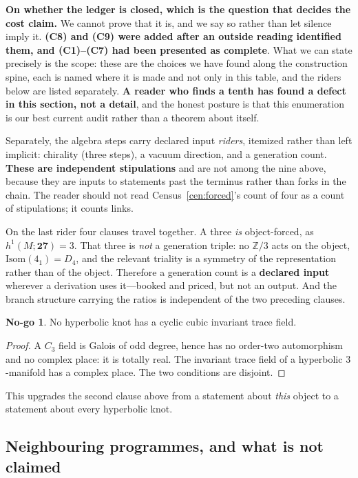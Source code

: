 \documentclass[11pt,reqno]{amsart}
\theoremstyle{plain}
\theoremstyle{definition}
\newtheorem{nogo}[theorem]{No-go}
\theoremstyle{remark}
\newcommand{\Z}{\mathbb{Z}}
\begin{document}
\textbf{On whether the ledger is closed, which is the question that decides the cost
claim.} We cannot prove that it is, and we say so rather than let silence imply it.
\textbf{(C8) and (C9) were added after an outside reading identified them, and
(C1)--(C7) had been presented as complete}. What we can state precisely is the scope:
these are the choices we have found along the construction spine, each is named where it
is made and not only in this table, and the riders below are listed separately.
\textbf{A reader who finds a tenth has found a defect in this section, not a detail},
and the honest posture is that this enumeration is our best current audit rather than a
theorem about itself.

Separately, the algebra steps carry declared input \emph{riders}, itemized rather than
left implicit: chirality (three steps), a vacuum direction, and a generation count.
\textbf{These are independent stipulations} and are not among the nine above, because
they are inputs to statements past the terminus rather than forks in the chain. The
reader should not read Census~\ref{cen:forced}'s count of four as a count of
stipulations; it counts links.

On the last rider four clauses travel together. A three \emph{is} object-forced, as
$h^1(M;\mathbf{27})=3$. That three is \emph{not} a generation triple: no $\Z/3$ acts on
the object, $\mathrm{Isom}(4_1)=D_4$, and the relevant triality is a symmetry of the
representation rather than of the object. Therefore a generation count is a
\textbf{declared input} wherever a derivation uses it---booked and priced, but not an
output. And the branch structure carrying the ratios is independent of the two preceding
clauses.

\begin{nogo}\label{ng:c3}
No hyperbolic knot has a cyclic cubic invariant trace field.
\end{nogo}

\begin{proof}
A $C_3$ field is Galois of odd degree, hence has no order-two automorphism and no
complex place: it is totally real. The invariant trace field of a hyperbolic
$3$-manifold has a complex place. The two conditions are disjoint.
\end{proof}

This upgrades the second clause above from a statement about \emph{this} object to a
statement about every hyperbolic knot.

\subsection{Neighbouring programmes, and what is not claimed}\label{sec:related}
\end{document}
